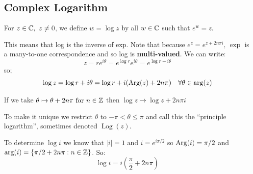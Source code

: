 \documentclass[../main.tex]{subfiles}
\begin{document}
\subsection{Complex Logarithm}
\begin{definition}
  For $z \in \mathbb{C},\ z \neq 0$, we define $w = \log z$ by all $w \in \mathbb{C}$ such that $e^{w} = z$.
\end{definition}
This means that log is the inverse of exp.
Note that because $e^{z} = e^{z + 2n\pi i}$, $\exp$ is a many-to-one correspondence and so log is \textbf{multi-valued}.
We can write:
\[
  z = re^{i\theta} = e^{\log r} e^{i \theta} = e^{\log r + i\theta}
\]
so;
\[
  \log z = \log r + i\theta = \log r + i(\operatorname{Arg}(z) + 2n\pi)\quad\forall \theta \in \arg(z)
\]
\begin{remark}
  If we take $\theta \mapsto \theta + 2n\pi \text{ for } n \in \mathbb{Z}$ then $\log z \mapsto \log z + 2n\pi i$

To make it unique we restrict $\theta$ to $-\pi < \theta \leq \pi$ and call this the ``principle logarithm'', sometimes denoted $\operatorname{Log}(z)$.
\end{remark}
\begin{example}
  To determine $\log i$ we know that $|i| = 1$ and $i = e^{i\pi/2}$ so $\operatorname{Arg}(i) = \pi/2$ and $\arg(i) = \{\pi/2 + 2n\pi: n \in \mathbb{Z}\}$. So:
  \[
    \log i = i\left(\frac{\pi}{2} + 2n\pi\right)
  \]
\end{example}
\end{document}
